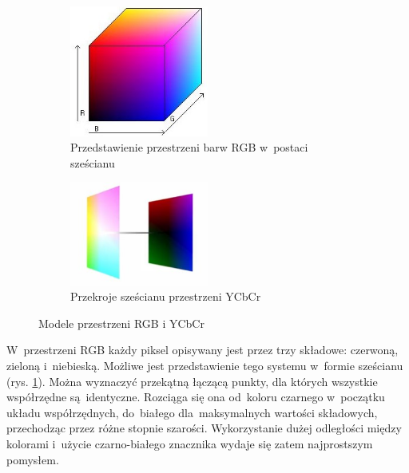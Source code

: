 \begin{figure}[h]
	\centering
	\begin{subfigure}{0.4\textwidth}
		\centering
		\includegraphics[width=0.5\textwidth]{szescian_rgb.jpg}
		\caption{Przedstawienie przestrzeni barw RGB w~postaci sześcianu \cite{obrazek_rgb}}
		\label{fig:szescian_rgb}
	\end{subfigure}%
	\begin{subfigure}{0.4\textwidth}
		\centering
		\includegraphics[width=0.5\textwidth]{szescian_ycbcr.jpg}
		\caption{Przekroje sześcianu przestrzeni YCbCr \cite{obrazek_ycbcr}}
		\label{fig:szescian_ycbcr}
	\end{subfigure}%
	\caption{Modele przestrzeni RGB i YCbCr}
	\label{fig:modele_przestrzeni}
\end{figure}

W~przestrzeni RGB każdy piksel opisywany jest przez trzy składowe: czerwoną, zieloną i~niebieską. 
Możliwe jest przedstawienie tego systemu w~formie sześcianu (rys. \ref{fig:szescian_rgb}). 
Można wyznaczyć przekątną łączącą punkty, dla których wszystkie współrzędne są~identyczne. 
Rozciąga się ona od~koloru czarnego w~początku układu współrzędnych, do~białego dla~maksymalnych wartości składowych, przechodząc przez różne stopnie szarości. 
Wykorzystanie dużej odległości między kolorami i~użycie czarno-białego znacznika wydaje się zatem najprostszym pomysłem.

